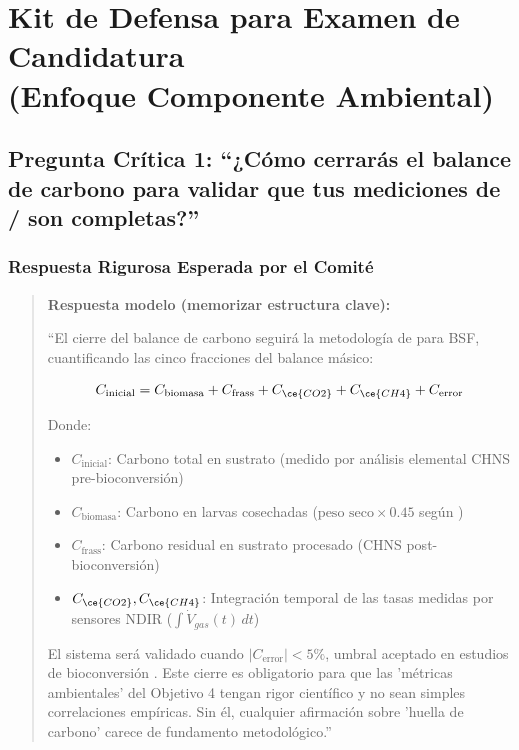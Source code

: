 \documentclass[12pt,oneside]{book}
\begin{document}
\chapter{Kit de Defensa para Examen de Candidatura \\ (Enfoque Componente Ambiental)}

\section{Pregunta Crítica 1: ``¿Cómo cerrarás el balance de carbono para validar que tus mediciones de / son completas?''}

\subsection{Respuesta Rigurosa Esperada por el Comité}

\begin{quote}
\textbf{Respuesta modelo (memorizar estructura clave):}

``El cierre del balance de carbono seguirá la metodología de \textcite{lalander2015yield} para BSF, cuantificando las cinco fracciones del balance másico:

\begin{equation}
C_{\text{inicial}} = C_{\text{biomasa}} + C_{\text{frass}} + C_{\ce{CO2}} + C_{\ce{CH4}} + C_{\text{error}}
\end{equation}

Donde:
\begin{itemize}
    \item $C_{\text{inicial}}$: Carbono total en sustrato (medido por análisis elemental CHNS pre-bioconversión)
    \item $C_{\text{biomasa}}$: Carbono en larvas cosechadas ($\text{peso seco} \times 0.45$ según \textcite{eriksen2022growth})
    \item $C_{\text{frass}}$: Carbono residual en sustrato procesado (CHNS post-bioconversión)
    \item $C_{\ce{CO2}}, C_{\ce{CH4}}$: Integración temporal de las tasas medidas por sensores NDIR ($\int \dot{V}_{gas}(t) \, dt$)
\end{itemize}

El sistema será validado cuando $|C_{\text{error}}| < 5\%$, umbral aceptado en estudios de bioconversión \parencite{mertenat2019greenhouse}. Este cierre es obligatorio para que las 'métricas ambientales' del Objetivo 4 tengan rigor científico y no sean simples correlaciones empíricas. Sin él, cualquier afirmación sobre 'huella de carbono' carece de fundamento metodológico.''
\end{quote}
\end{document}
